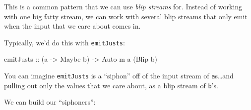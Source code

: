\documentclass[]{article}
\newenvironment{Shaded}{}{}
\newcommand{\CommentTok}[1]{\textcolor[rgb]{0.38,0.63,0.69}{\textit{#1}}}
\newcommand{\DataTypeTok}[1]{\textcolor[rgb]{0.56,0.13,0.00}{#1}}
\newcommand{\FunctionTok}[1]{\textcolor[rgb]{0.02,0.16,0.49}{#1}}
\newcommand{\NormalTok}[1]{#1}
\newcommand{\OperatorTok}[1]{\textcolor[rgb]{0.40,0.40,0.40}{#1}}
\newcommand{\OtherTok}[1]{\textcolor[rgb]{0.00,0.44,0.13}{#1}}
\begin{document}
This is a common pattern that we can use \emph{blip streams} for. Instead of
working with one big fatty stream, we can work with several blip streams that
only emit when the input that we care about comes in.

Typically, we'd do this with \texttt{emitJusts}:

\begin{Shaded}
\begin{Highlighting}[]
\OtherTok{emitJusts ::}\NormalTok{ (a }\OtherTok{{-}\textgreater{}} \DataTypeTok{Maybe}\NormalTok{ b) }\OtherTok{{-}\textgreater{}} \DataTypeTok{Auto}\NormalTok{ m a (}\DataTypeTok{Blip}\NormalTok{ b)}
\end{Highlighting}
\end{Shaded}

You can imagine \texttt{emitJusts} is a ``siphon'' off of the input stream of
\texttt{a}s\ldots and pulling out only the values that we care about, as a blip
stream of \texttt{b}'s.

We can build our ``siphoners'':

\begin{Shaded}
\end{Shaded}
\end{document}
